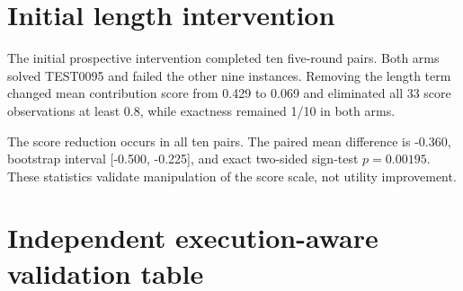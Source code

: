 \section{Initial length intervention}

The initial prospective intervention completed ten five-round pairs. Both arms solved TEST0095 and failed the other nine instances. Removing the length term changed mean contribution score from 0.429 to 0.069 and eliminated all 33 score observations at least 0.8, while exactness remained 1/10 in both arms.

\begin{center}
\end{center}

The score reduction occurs in all ten pairs. The paired mean difference is -0.360, bootstrap interval [-0.500, -0.225], and exact two-sided sign-test \(p=0.00195\). These statistics validate manipulation of the score scale, not utility improvement.

\section{Independent execution-aware validation table}

\begin{center}
\end{center}

